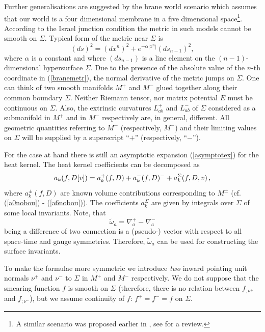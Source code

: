 Further generalisations are suggested by the brane world scenario
\cite{Randall:1999ee,Randall:1999vf} which assumes that our world
is a four dimensional membrane in a five dimensional space\footnote{
A similar scenario was proposed earlier in \cite{Rubakov:1983bb},
see \cite{Rubakov:2001kp} for a review.}. According to the Israel
junction condition \cite{Israel:1966rt} the metric in such models
cannot be smooth on $\Sigma$. Typical form of the metric near 
$\Sigma$ is 
\begin{equation}
(ds)^2=(dx^n)^2 + e^{-\alpha |x^n|} (ds_{n-1})^2, \label{branemetr}
\end{equation}
where $\alpha$ is a constant and where $(ds_{n-1})$ is a line element
on the $(n-1)$-dimensional hypersurface $\Sigma$. Due to the presence of the
absolute value of the $n$-th coordinate in (\ref{branemetr}), the normal
derivative of the metric jumps on $\Sigma$.
One can think of two smooth manifolds
$M^+$ and $M^-$ glued together along their common boundary $\Sigma$.
Neither Riemann tensor, nor matrix potential $E$ must be continuous
on $\Sigma$. Also, the extrinsic curvatures $L_{ab}^+$ and $L_{ab}^-$
of $\Sigma$ considered as a submanifold in $M^+$ and in $M^-$ 
respectively are, in general,
different. All geometric quantities referring to $M^-$ (respectively,
$M^-$) and their limiting values on $\Sigma$ will be supplied by
a superscript ``$+$'' (respectively, ``$-$'').  

For the case at hand there is still an asymptotic expansion (\ref{asymptotex})
for the heat kernel. The heat kernel coefficients can be decomposed as
\begin{equation}
a_k(f,D[v ])=a_k^+(f,D) + a_k^-(f,D)^- +a_k^\Sigma (f,D,v )\,,
\label{apmSigma}
\end{equation}
where $a_k^\pm (f,D)$ are known volume contributions corresponding
to $M^\pm$ (cf. (\ref{a0nobou}) - (\ref{a6nobou})). The coefficients
$a_k^\Sigma$ are given by integrals over $\Sigma$ of some local
invariants. Note, that 
\begin{equation}
\tilde\omega_a=\nabla_a^+-\nabla_a^- \label{tiloma}
\end{equation}
being a difference of two connection is a (pseudo-) vector with respect to
all space-time and gauge symmetries. Therefore, $\tilde\omega_a$ can be
used for constructing the surface invariants.

To make the formulae more symmetric we introduce {\it two} inward pointing
unit normals $\nu^+$ and $\nu^-$ to $\Sigma$ in $M^+$ and $M^-$ respectively.
We do not suppose that the smearing function $f$ is smooth on $\Sigma$
(therefore, there is no relation between $f_{;\nu^+}$ and $f_{;\nu^-}$),
but we assume continuity of $f$: $f^+=f^-=f$ on $\Sigma$.  

